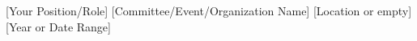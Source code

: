 

\begin{cvhonors}

%
  \cvhonor
    {[Your Position/Role]} %
    {[Committee/Event/Organization Name]} %
    {[Location or empty]} %
    {[Year or Date Range]} %


\end{cvhonors}
